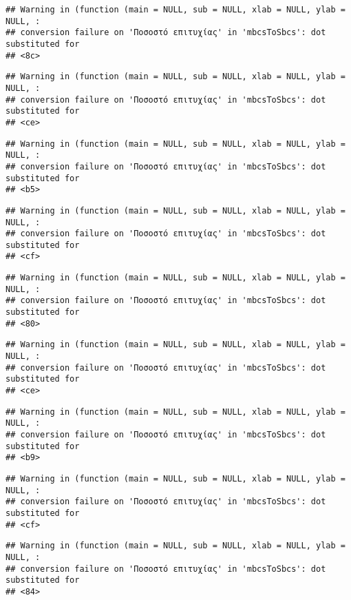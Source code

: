 \documentclass[
]{article}
\begin{document}
\begin{verbatim}
## Warning in (function (main = NULL, sub = NULL, xlab = NULL, ylab = NULL, :
## conversion failure on 'Ποσοστό επιτυχίας' in 'mbcsToSbcs': dot substituted for
## <8c>
\end{verbatim}

\begin{verbatim}
## Warning in (function (main = NULL, sub = NULL, xlab = NULL, ylab = NULL, :
## conversion failure on 'Ποσοστό επιτυχίας' in 'mbcsToSbcs': dot substituted for
## <ce>
\end{verbatim}

\begin{verbatim}
## Warning in (function (main = NULL, sub = NULL, xlab = NULL, ylab = NULL, :
## conversion failure on 'Ποσοστό επιτυχίας' in 'mbcsToSbcs': dot substituted for
## <b5>
\end{verbatim}

\begin{verbatim}
## Warning in (function (main = NULL, sub = NULL, xlab = NULL, ylab = NULL, :
## conversion failure on 'Ποσοστό επιτυχίας' in 'mbcsToSbcs': dot substituted for
## <cf>
\end{verbatim}

\begin{verbatim}
## Warning in (function (main = NULL, sub = NULL, xlab = NULL, ylab = NULL, :
## conversion failure on 'Ποσοστό επιτυχίας' in 'mbcsToSbcs': dot substituted for
## <80>
\end{verbatim}

\begin{verbatim}
## Warning in (function (main = NULL, sub = NULL, xlab = NULL, ylab = NULL, :
## conversion failure on 'Ποσοστό επιτυχίας' in 'mbcsToSbcs': dot substituted for
## <ce>
\end{verbatim}

\begin{verbatim}
## Warning in (function (main = NULL, sub = NULL, xlab = NULL, ylab = NULL, :
## conversion failure on 'Ποσοστό επιτυχίας' in 'mbcsToSbcs': dot substituted for
## <b9>
\end{verbatim}

\begin{verbatim}
## Warning in (function (main = NULL, sub = NULL, xlab = NULL, ylab = NULL, :
## conversion failure on 'Ποσοστό επιτυχίας' in 'mbcsToSbcs': dot substituted for
## <cf>
\end{verbatim}

\begin{verbatim}
## Warning in (function (main = NULL, sub = NULL, xlab = NULL, ylab = NULL, :
## conversion failure on 'Ποσοστό επιτυχίας' in 'mbcsToSbcs': dot substituted for
## <84>
\end{verbatim}
\end{document}
